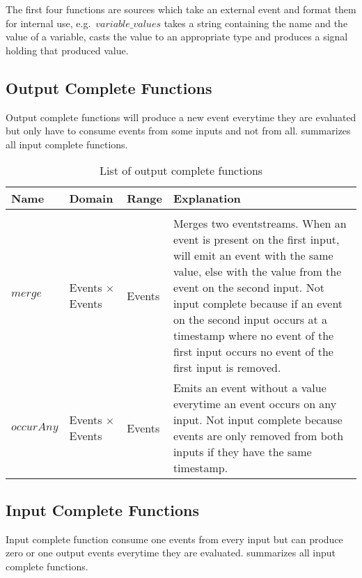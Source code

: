 The first four functions are sources which take an external event and format them for internal use, e.g.\ \(\mathit{variable\_values}\) takes a string containing the name and the value of a variable, casts the value to an appropriate type and produces a signal holding that produced value.

\subsection{Output Complete Functions}
\label{sec:definitions:tessla_functions:output_complete}

Output complete functions will produce a new event everytime they are evaluated but only have to consume events from some inputs and not from all.
 summarizes all input complete functions.

\begin{table}[!htb]
  \begin{tabularx}{\textwidth}{lllX}
    Name                 & Domain        & Range   & Explanation \\
    \toprule \\
    \(\mathit{merge}\)            & Events \(\times\) Events  & Events  & Merges two eventstreams. When an event is present on the first input, will emit an event with the same value, else with the value from the event on the second input. Not input complete because if an event on the second input occurs at a timestamp where no event of the first input occurs no event of the first input is removed. \\
    \(\mathit{occurAny}\)         & Events \(\times\) Events  & Events  & Emits an event without a value everytime an event occurs on any input. Not input complete because events are only removed from both inputs if they have the same timestamp. \\
  \end{tabularx}
\caption{List of output complete functions}
\label{table:output_complete_functions}
\end{table}


\subsection{Input Complete Functions}
\label{sec:definitions:tessla_functions:input_complete}

Input complete function consume one events from every input but can produce zero or one output events everytime they are evaluated.
 summarizes all input complete functions.


